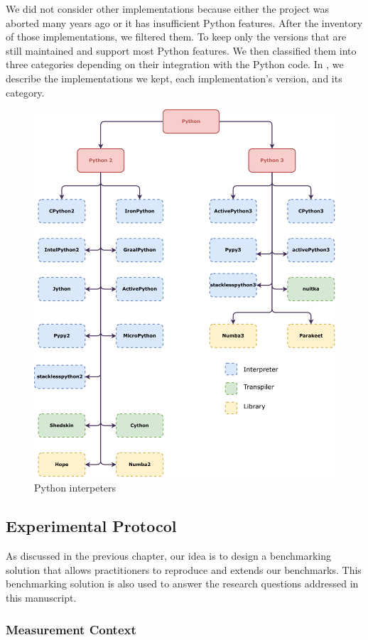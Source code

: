We did not consider other implementations because either the project was aborted many years ago or it has insufficient Python features.
After the inventory of those implementations, we filtered them.
To keep only the versions that are still maintained and support most Python features.
We then classified them into three categories depending on their integration with the Python code.
In , we describe the implementations we kept, each implementation's version, and its category.

\begin{figure}
      \centering
      \includegraphics[width=.7\linewidth]{imgs/python-implementations-tree}
      \caption{Python interpeters}
      \label{fig:interpreters}
\end{figure}



\subsection{Experimental Protocol}
As discussed in the previous chapter, our idea is to design a benchmarking solution that allows practitioners to reproduce and extends our benchmarks.
This benchmarking solution is also used to answer the research questions addressed in this manuscript.


\subsubsection{Measurement Context}
